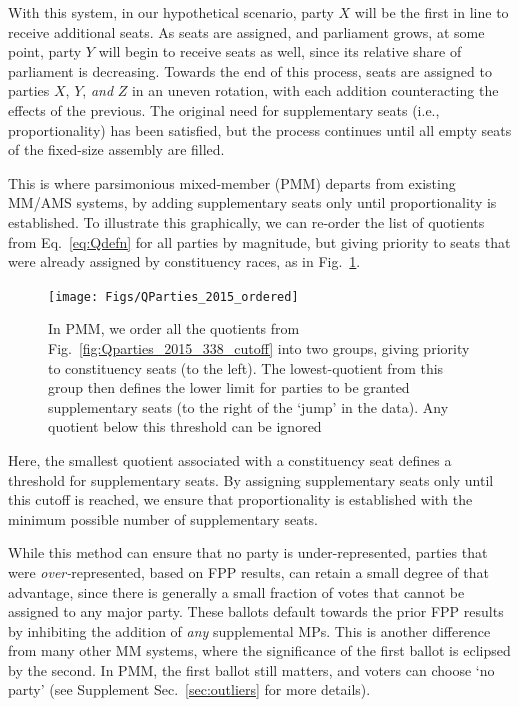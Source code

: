With this system, in our hypothetical scenario, party $X$ will be the first in line to receive additional seats. As seats are assigned, and parliament grows, at some point, party $Y$ will begin to receive seats as well, since its relative share of parliament is decreasing. 
Towards the end of this process, seats are assigned to parties $X$, $Y$, \emph{and} $Z$ in an uneven rotation, with each addition counteracting the effects of the previous. The original need for supplementary seats (i.e., proportionality) has been satisfied, but the process continues until all empty seats of the fixed-size assembly are filled. 

This is where parsimonious mixed-member (PMM) departs from existing MM/AMS systems, by adding supplementary seats only until proportionality is established. To illustrate this graphically, we can re-order the list of quotients from Eq.~\ref{eq:Qdefn} for all parties by magnitude, but giving priority to seats that were already assigned by constituency races, as in Fig.~\ref{fig:QParties_2015_ordered}.
\begin{figure}
  \texttt{[image: Figs/QParties\_2015\_ordered]}
  \captionsetup{format=default}
  \caption{ In PMM, we order all the quotients from Fig.~\ref{fig:Qparties_2015_338_cutoff} into two groups, giving priority to constituency seats (to the left). The lowest-quotient from this group then defines the lower limit for parties to be granted supplementary seats (to the right of the `jump' in the data). Any quotient below this threshold can be ignored }
\label{fig:QParties_2015_ordered}
\end{figure} 
Here, the smallest quotient associated with a constituency seat defines a threshold for supplementary seats. By assigning supplementary seats only until this cutoff is reached, we ensure that proportionality is established with the minimum possible number of supplementary seats. 

While this method can ensure that no party is under-represented, parties that were \emph{over-}represented, based on FPP results, can retain a small degree of that advantage, since there is generally a small fraction of votes that cannot be assigned to any major party. These ballots default towards the prior FPP results by inhibiting the addition of \emph{any} supplemental MPs.
This is another difference from many other MM systems, where the significance of the first ballot is eclipsed by the second. In PMM, the first ballot still matters, and voters can choose `no party' (see Supplement Sec.~\ref{sec:outliers} for more details).

